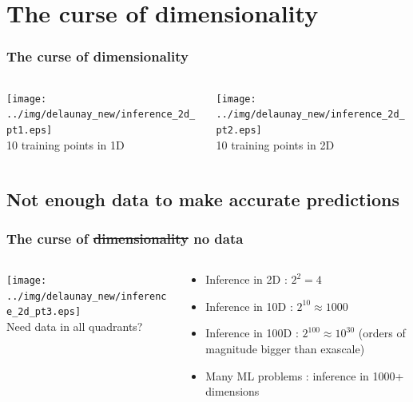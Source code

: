 \documentclass[aspectratio=169]{beamer}
\begin{document}
\section{The curse of dimensionality}

\begin{frame}
\frametitle{The curse of dimensionality}

\begin{columns}
\begin{column}{0.5\textwidth}
\begin{center}
\texttt{[image: ../img/delaunay\_new/inference\_2d\_pt1.eps]}\\
10 training points in 1D
\end{center}
\end{column}

\begin{column}{0.5\textwidth}
\begin{center}
\texttt{[image: ../img/delaunay\_new/inference\_2d\_pt2.eps]}\\
10 training points in 2D
\end{center}
\end{column}
\end{columns}
\end{frame}

\subsection{Not enough data to make accurate predictions}

\begin{frame}
\frametitle{The curse of \sout{dimensionality} no data}

\begin{columns}
\begin{column}{0.5\textwidth}
\begin{center}
\texttt{[image: ../img/delaunay\_new/inference\_2d\_pt3.eps]}\\
Need data in all quadrants?
\end{center}
\end{column}

\begin{column}{0.5\textwidth}
\pause
\begin{itemize}
\item Inference in 2D : $2^2 = 4$
\item Inference in 10D : $2^{10} \approx 1000$
\item Inference in 100D : $2^{100} \approx 10^{30}$ (orders of magnitude bigger than exascale)
\item Many ML problems : inference in 1000+ dimensions
\end{itemize}
\end{column}
\end{columns}
\end{frame}
\end{document}
